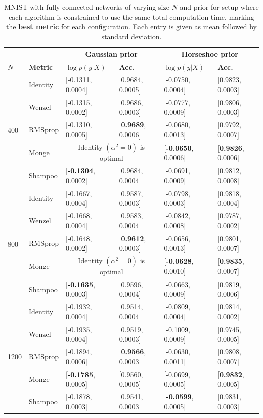 \documentclass[10pt]{article} %
\theoremstyle{plain}
\theoremstyle{definition}
\theoremstyle{remark}
\begin{document}
\begin{table}[t]
\begin{center}
\begin{tabular}{ll|ll|ll}
 & & \multicolumn{2}{c}{Gaussian prior} &
 \multicolumn{2}{c}{Horseshoe prior} \\
\hline
$N$ & {\bf Metric}                   & $\log p(y|X)$  & {\bf Acc.}
& $\log p(y|X)$  & {\bf Acc.}        \\
\hline
\multirow{5}{1em}{400} & 
Identity & 
[-0.1311, 0.0004] & [0.9684, 0.0005] &
[-0.0750, 0.0004]  & [0.9823, 0.0003] \\
& Wenzel  & 
[-0.1315, 0.0002] & [0.9686, 0.0003] &
[-0.0777, 0.0009] & [0.9806, 0.0003] \\
& RMSprop &
[-0.1310, 0.0005] & [{\bf 0.9689}, 0.0006] & 
[-0.0680, 0.0013] & [0.9792, 0.0007] \\
& Monge   &
\multicolumn{2}{c|}{Identity $(\alpha^{2}=0)$ is optimal} &
[{\bf -0.0650}, 0.0006] & [{\bf 0.9826}, 0.0006] \\
& Shampoo &
[{\bf -0.1304}, 0.0002] & [0.9684, 0.0004] &
[-0.0691, 0.0009] & [0.9812, 0.0008] \\
\hline
\multirow{5}{1em}{800} & 
Identity & 
[-0.1667, 0.0004] & [0.9587, 0.0003] &
[-0.0798, 0.0003] & [0.9818, 0.0004] \\
& Wenzel  & 
[-0.1668, 0.0004] & [0.9583, 0.0004] &
[-0.0842, 0.0008] & [0.9787, 0.0002] \\
& RMSprop &
[-0.1648, 0.0002] & [{\bf 0.9612}, 0.0003] &
[-0.0656, 0.0013] & [0.9801, 0.0007] \\
& Monge   &
\multicolumn{2}{c|}{Identity $(\alpha^{2}=0)$ is optimal} &
[{\bf -0.0628}, 0.0010] & [{\bf 0.9835}, 0.0007] \\
& Shampoo &
[{\bf -0.1635}, 0.0003] & [0.9596, 0.0004] &
[-0.0663, 0.0009] & [0.9819, 0.0006] \\
\hline
\multirow{5}{1em}{1200} & 
Identity & 
[-0.1932, 0.0004] & [0.9514, 0.0004] &
[-0.0809, 0.0004] & [0.9814, 0.0002] \\
& Wenzel & 
[-0.1935, 0.0004] & [0.9519, 0.0003] &
[-0.1009, 0.0009] & [0.9745, 0.0005] \\
& RMSprop &
[-0.1894, 0.0006] & [{\bf 0.9566}, 0.0003] &
[-0.0630, 0.0011] & [0.9808, 0.0007] \\
& Monge   &
[{\bf -0.1785}, 0.0005] & [0.9560, 0.0005] &
[-0.0699, 0.0005] & [{\bf 0.9832}, 0.0005] \\
& Shampoo &
[-0.1878, 0.0003] & [0.9541, 0.0003] &
[{\bf -0.0599}, 0.0005] & [0.9831, 0.0003] \\
\hline
\end{tabular}
\caption{MNIST with fully connected networks of varying size $N$ and prior for setup where each algorithm is constrained to use the same total computation time, marking the {\bf best metric} for each configuration. Each entry is given as mean followed by standard deviation.}
\label{table:mnist-equal-time}
\end{center}
\end{table}
\end{document}
